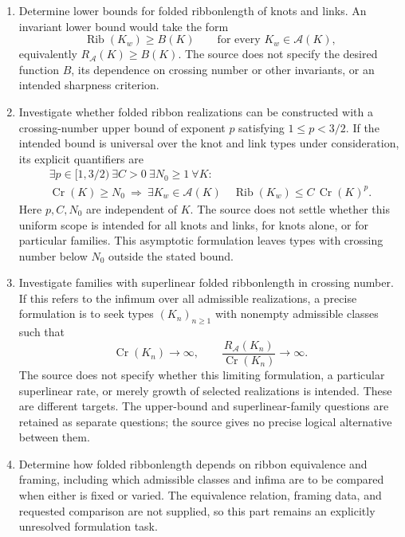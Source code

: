 \documentclass[11pt]{article}
\begin{document}
\begin{enumerate}
\item Determine lower bounds for folded ribbonlength of knots and links. An invariant lower bound would take the form
\[
\operatorname{Rib}(K_w)\geq B(K)
\qquad\text{for every }K_w\in\mathcal A(K),
\]
equivalently \(R_{\mathcal A}(K)\geq B(K)\). The source does not specify the desired function \(B\), its dependence on crossing number or other invariants, or an intended sharpness criterion.

\item Investigate whether folded ribbon realizations can be constructed with a crossing-number upper bound of exponent \(p\) satisfying \(1\leq p<3/2\). If the intended bound is universal over the knot and link types under consideration, its explicit quantifiers are
\[
\begin{gathered}
\exists p\in[1,3/2)\ \exists C>0\ \exists N_0\geq1\ \forall K:\\
\operatorname{Cr}(K)\geq N_0
\ \Longrightarrow\
\exists K_w\in\mathcal A(K)\quad
\operatorname{Rib}(K_w)\leq C\,\operatorname{Cr}(K)^p.
\end{gathered}
\]
Here \(p,C,N_0\) are independent of \(K\). The source does not settle whether this uniform scope is intended for all knots and links, for knots alone, or for particular families. This asymptotic formulation leaves types with crossing number below \(N_0\) outside the stated bound.

\item Investigate families with superlinear folded ribbonlength in crossing number. If this refers to the infimum over all admissible realizations, a precise formulation is to seek types \((K_n)_{n\geq1}\) with nonempty admissible classes such that
\[
\operatorname{Cr}(K_n)\longrightarrow\infty,
\qquad
\frac{R_{\mathcal A}(K_n)}{\operatorname{Cr}(K_n)}\longrightarrow\infty.
\]
The source does not specify whether this limiting formulation, a particular superlinear rate, or merely growth of selected realizations is intended. These are different targets. The upper-bound and superlinear-family questions are retained as separate questions; the source gives no precise logical alternative between them.

\item Determine how folded ribbonlength depends on ribbon equivalence and framing, including which admissible classes and infima are to be compared when either is fixed or varied. The equivalence relation, framing data, and requested comparison are not supplied, so this part remains an explicitly unresolved formulation task.
\end{enumerate}
\end{document}

